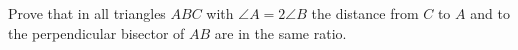 Prove that in all triangles $ABC$ with $\angle A = 2\angle B$ the distance from $C$ to $A$ and to the perpendicular bisector of $AB$ are in the same ratio.